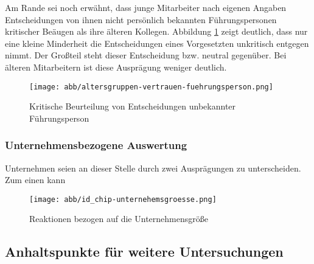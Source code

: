 Am Rande sei noch erwähnt, dass junge Mitarbeiter nach eigenen Angaben Entscheidungen von ihnen nicht persönlich bekannten Führungspersonen kritischer Beäugen als ihre älteren Kollegen.
Abbildung \ref{fig:kritische-beurteilung} zeigt deutlich, dass nur eine kleine Minderheit die Entscheidungen eines Vorgesetzten unkritisch entgegen nimmt.
Der Großteil steht dieser Entscheidung bzw. neutral gegenüber.
Bei älteren Mitarbeitern ist diese Ausprägung weniger deutlich.

\begin{figure}[htbp]
	\centering
	\texttt{[image: abb/altersgruppen-vertrauen-fuehrungsperson.png]}
	\caption{Kritische Beurteilung von Entscheidungen unbekannter Führungsperson}
	\label{fig:kritische-beurteilung}
\end{figure}

\subsubsection{Unternehmensbezogene Auswertung}\label{sec:unternehmensbezogene-auswertung}

Unternehmen seien an dieser Stelle durch zwei Ausprägungen zu unterscheiden.
Zum einen kann 


\begin{figure}[htbp]
	\centering
	\texttt{[image: abb/id\_chip-unternehemsgroesse.png]}
	\caption{Reaktionen bezogen auf die Unternehmensgröße}
	\label{fig:id-chip-unternehmensgroesse}
\end{figure}


\subsection{Anhaltspunkte für weitere Untersuchungen}\label{sec:anhaltspunkte-fuer-weitere-untersuchungen}